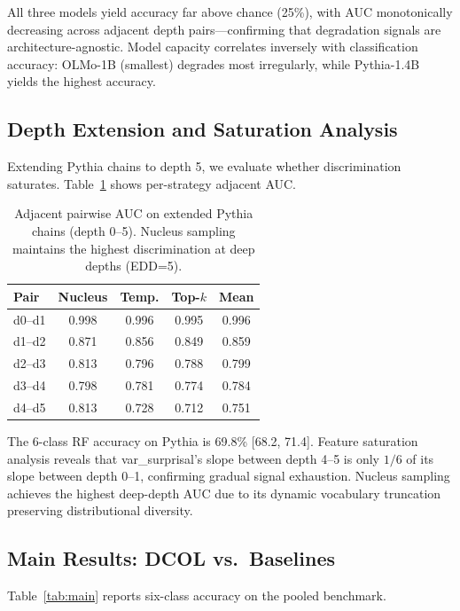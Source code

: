 \documentclass[11pt,a4paper]{article}
\newcommand{\ours}{DCOL}
\begin{document}
All three models yield accuracy far above chance (25\%), with AUC monotonically decreasing across adjacent depth pairs---confirming that degradation signals are architecture-agnostic.
Model capacity correlates inversely with classification accuracy: OLMo-1B (smallest) degrades most irregularly, while Pythia-1.4B yields the highest accuracy.

\subsection{Depth Extension and Saturation Analysis}
\label{sec:depth_extension}

Extending Pythia chains to depth 5, we evaluate whether discrimination saturates.
Table~\ref{tab:extended_auc} shows per-strategy adjacent AUC.

\begin{table}[t]
\centering
\small
\begin{tabular}{lcccc}
\toprule
\textbf{Pair} & \textbf{Nucleus} & \textbf{Temp.} & \textbf{Top-$k$} & \textbf{Mean} \\
\midrule
d0--d1 & 0.998 & 0.996 & 0.995 & 0.996 \\
d1--d2 & 0.871 & 0.856 & 0.849 & 0.859 \\
d2--d3 & 0.813 & 0.796 & 0.788 & 0.799 \\
d3--d4 & 0.798 & 0.781 & 0.774 & 0.784 \\
d4--d5 & 0.813 & 0.728 & 0.712 & 0.751 \\
\bottomrule
\end{tabular}
\caption{Adjacent pairwise AUC on extended Pythia chains (depth 0--5). Nucleus sampling maintains the highest discrimination at deep depths (EDD=5).}
\label{tab:extended_auc}
\end{table}

The 6-class RF accuracy on Pythia is 69.8\% [68.2, 71.4]. Feature saturation analysis reveals that var\_surprisal's slope between depth 4--5 is only $1/6$ of its slope between depth 0--1, confirming gradual signal exhaustion. Nucleus sampling achieves the highest deep-depth AUC due to its dynamic vocabulary truncation preserving distributional diversity.

\subsection{Main Results: \ours{} vs.\ Baselines}
\label{sec:main_results}

Table~\ref{tab:main} reports six-class accuracy on the pooled benchmark.
\end{document}
